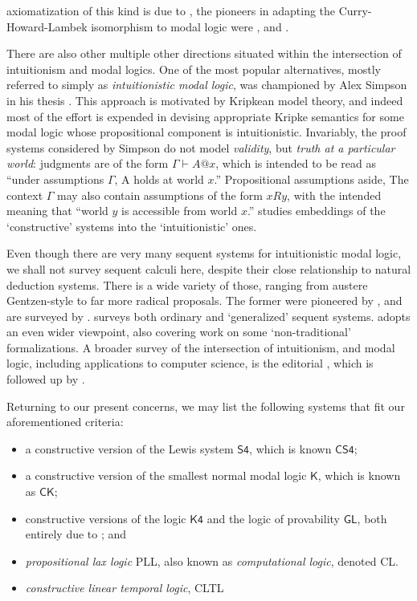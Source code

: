 \documentclass[a4paper]{amsart}
\begin{document}
axiomatization of this kind is due to \cite{Wijesekera1990}, the
pioneers in adapting the Curry-Howard-Lambek isomorphism to modal
logic were \cite{Bierman1992a, Bierman1996a,
Bierman2000a}, and \cite{Moggi1989, Moggi1991}.

There are also other multiple other directions situated within the
intersection of intuitionism and modal logics.  One of the most
popular alternatives, mostly referred to simply as
\emph{intuitionistic modal logic}, was championed by Alex Simpson
in his thesis \citep{Simpson1994}. This approach is motivated by
Kripkean model theory, and indeed most of the effort is expended
in devising appropriate Kripke semantics for some modal logic
whose propositional component is intuitionistic. Invariably, the
proof systems considered by Simpson do not model \emph{validity},
but \emph{truth at a particular world}: judgments are of the form
$\Gamma \vdash A @ x$, which is intended to be read as ``under
assumptions $\Gamma$, A holds at world $x$.'' Propositional
assumptions aside, The context $\Gamma$ may also contain
assumptions of the form $x R y$, with the intended meaning that
``world $y$ is accessible from world $x$.'' \cite{Ranalter2010}
studies embeddings of the `constructive' systems into the
`intuitionistic' ones.

Even though there are very many sequent systems for intuitionistic
modal logic, we shall not survey sequent calculi here, despite
their close relationship to natural deduction systems. There is a
wide variety of those, ranging from austere Gentzen-style to
far more radical proposals. The former were pioneered by
\cite{Ohnisi1957, Ohnisi1959}, and are surveyed by \cite{Ono1998}.
\cite{Wansing2002} surveys both ordinary and `generalized' sequent
systems. \cite{Negri2011} adopts an even wider viewpoint, also
covering work on some `non-traditional' formalizations. A broader
survey of the intersection of intuitionism, and modal logic,
including applications to computer science, is the editorial
\citep{DePaiva2004}, which is followed up by \citep{Stewart2015}.

Returning to our present concerns, we may list the following
systems that fit our aforementioned criteria: \begin{itemize}
  \item a constructive version of the Lewis system $\mathsf{S4}$, which is
  known $\mathsf{CS4}$; 

  \item a constructive version of the smallest
  normal modal logic $\mathsf{K}$, which is known as $\mathsf{CK}$;

  \item constructive versions of the logic $\mathsf{K4}$ and the
  logic of provability $\mathsf{GL}$, both entirely due to
  \cite{Bellin1985}; and

  \item \emph{propositional lax logic} \textsf{PLL},
  also known as \emph{computational logic}, denoted \textsf{CL}.

  \item \emph{constructive linear temporal logic}, \textsf{CLTL}
\end{itemize} 
\end{document}
